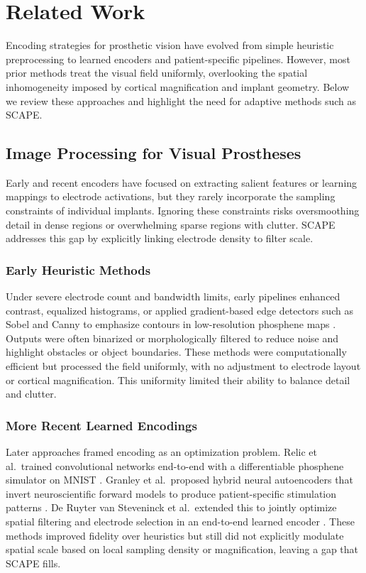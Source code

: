 \section{Related Work}
Encoding strategies for prosthetic vision have evolved from simple heuristic preprocessing to learned encoders and patient-specific pipelines. However, most prior methods treat the visual field uniformly, overlooking the spatial inhomogeneity imposed by cortical magnification and implant geometry. Below we review these approaches and highlight the need for adaptive methods such as SCAPE.

\subsection{Image Processing for Visual Prostheses}
Early and recent encoders have focused on extracting salient features or learning mappings to electrode activations, but they rarely incorporate the sampling constraints of individual implants. Ignoring these constraints risks oversmoothing detail in dense regions or overwhelming sparse regions with clutter. SCAPE addresses this gap by explicitly linking electrode density to filter scale.

\subsubsection{Early Heuristic Methods}
Under severe electrode count and bandwidth limits, early pipelines enhanced contrast, equalized histograms, or applied gradient-based edge detectors such as Sobel and Canny to emphasize contours in low-resolution phosphene maps \cite{Liu2005,Oh2024}. Outputs were often binarized or morphologically filtered to reduce noise and highlight obstacles or object boundaries. These methods were computationally efficient but processed the field uniformly, with no adjustment to electrode layout or cortical magnification. This uniformity limited their ability to balance detail and clutter.

\subsubsection{More Recent Learned Encodings}
Later approaches framed encoding as an optimization problem. Relic et al.\ trained convolutional networks end-to-end with a differentiable phosphene simulator on MNIST \cite{Relic2022}. Granley et al.\ proposed hybrid neural autoencoders that invert neuroscientific forward models to produce patient-specific stimulation patterns \cite{Granley2022}. De Ruyter van Steveninck et al.\ extended this to jointly optimize spatial filtering and electrode selection in an end-to-end learned encoder \cite{deRuytervanSteveninck2020}. These methods improved fidelity over heuristics but still did not explicitly modulate spatial scale based on local sampling density or magnification, leaving a gap that SCAPE fills.

